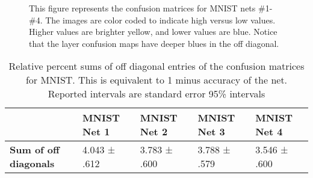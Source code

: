 \begin{figure}[ht]
	\centering
	
	\caption[Confusion matrices for MNIST nets \#1-\#4]{This figure represents the confusion matrices for MNIST nets \#1-\#4.  The images are color coded to indicate high versus low values.  Higher values are brighter yellow, and lower values are blue. Notice that the \RS layer confusion maps have deeper blues in the off diagonal.}
	\label{fig:benfordconfusionstikz}
\end{figure}

\begin{table}[ht]
	\renewcommand{\arraystretch}{1.4}
	\centering
	\begin{tabular}{l|l|l|l|l|}
		\cline{2-5}
		& \textbf{MNIST Net 1} & \textbf{MNIST Net 2} & \textbf{MNIST Net 3} & \textbf{MNIST Net 4} \\ \hline
		\multicolumn{1}{|l|}{\textbf{Sum of off diagonals}} & 4.043 ± .612         & 3.783 ± .600         & 3.788 ± .579         & 3.546 ± .600         \\ \hline
	\end{tabular}
	\caption[Accuracy of MNIST training with imbalanced data]{Relative percent sums of off diagonal entries of the confusion matrices for MNIST. This is equivalent to 1 minus accuracy of the net. Reported intervals are standard error 95\% intervals}
\end{table}

